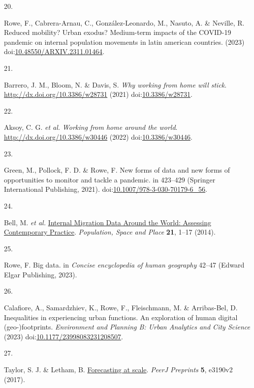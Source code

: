\documentclass[
  11pt,
]{article}
\newlength{\cslhangindent}
\newlength{\csllabelwidth}
\newlength{\cslentryspacingunit} %
\newenvironment{CSLReferences}[2] %
 {%
  \setlength{\parindent}{0pt}
  \ifodd #1
  \let\oldpar\par
  \def\par{\hangindent=\cslhangindent\oldpar}
  \fi
  \setlength{\parskip}{#2\cslentryspacingunit}
 }%
 {}
\newcommand{\CSLLeftMargin}[1]{\parbox[t]{\csllabelwidth}{#1}}
\newcommand{\CSLRightInline}[1]{\parbox[t]{\linewidth - \csllabelwidth}{#1}\break}
\begin{document}
\begin{CSLReferences}{0}{0}
\leavevmode{}%
\CSLLeftMargin{20. }%
\CSLRightInline{Rowe, F., Cabrera-Arnau, C., González-Leonardo, M.,
Nasuto, A. \& Neville, R. Reduced mobility? Urban exodus? Medium-term
impacts of the COVID-19 pandemic on internal population movements in
latin american countries. (2023)
doi:\href{https://doi.org/10.48550/ARXIV.2311.01464}{10.48550/ARXIV.2311.01464}.}

\leavevmode{}%
\CSLLeftMargin{21. }%
\CSLRightInline{Barrero, J. M., Bloom, N. \& Davis, S. \emph{Why working
from home will stick}. \url{http://dx.doi.org/10.3386/w28731} (2021)
doi:\href{https://doi.org/10.3386/w28731}{10.3386/w28731}.}

\leavevmode{}%
\CSLLeftMargin{22. }%
\CSLRightInline{Aksoy, C. G. \emph{et al.} \emph{Working from home
around the world}. \url{http://dx.doi.org/10.3386/w30446} (2022)
doi:\href{https://doi.org/10.3386/w30446}{10.3386/w30446}.}

\leavevmode{}%
\CSLLeftMargin{23. }%
\CSLRightInline{Green, M., Pollock, F. D. \& Rowe, F. New forms of data
and new forms of opportunities to monitor and tackle a pandemic. in
423--429 (Springer International Publishing, 2021).
doi:\href{https://doi.org/10.1007/978-3-030-70179-6_56}{10.1007/978-3-030-70179-6\_56}.}

\leavevmode{}%
\CSLLeftMargin{24. }%
\CSLRightInline{Bell, M. \emph{et al.}
\href{https://doi.org/10.1002/psp.1848}{Internal Migration Data Around
the World: Assessing Contemporary Practice}. \emph{Population, Space and
Place} \textbf{21}, 1--17 (2014).}

\leavevmode{}%
\CSLLeftMargin{25. }%
\CSLRightInline{Rowe, F. Big data. in \emph{Concise encyclopedia of
human geography} 42--47 (Edward Elgar Publishing, 2023).}

\leavevmode{}%
\CSLLeftMargin{26. }%
\CSLRightInline{Calafiore, A., Samardzhiev, K., Rowe, F., Fleischmann,
M. \& Arribas-Bel, D. Inequalities in experiencing urban functions. An
exploration of human digital (geo-)footprints. \emph{Environment and
Planning B: Urban Analytics and City Science} (2023)
doi:\href{https://doi.org/10.1177/23998083231208507}{10.1177/23998083231208507}.}

\leavevmode{}%
\CSLLeftMargin{27. }%
\CSLRightInline{Taylor, S. J. \& Letham, B.
\href{https://doi.org/10.7287/peerj.preprints.3190v2}{Forecasting at
scale}. \emph{PeerJ Preprints} \textbf{5}, e3190v2 (2017).}


\end{CSLReferences}
\end{document}
